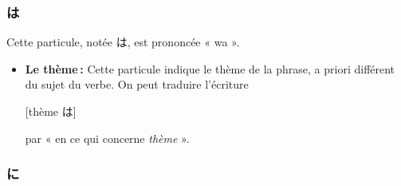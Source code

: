         \subsubsection{は}

    Cette particule, notée は, est prononcée « wa ».

    \begin{itemize}
        \item \textbf{Le thème :} Cette particule indique le thème de la phrase, a priori différent du sujet du verbe. On peut traduire l'écriture 
        \begin{center}
            [thème は]
        \end{center}
        par « en ce qui concerne \textit{thème} ».
    \end{itemize}

        \subsubsection{に}

